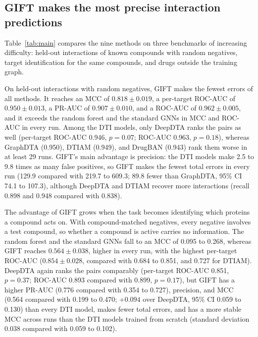 \documentclass[10pt,letterpaper]{article}
\begin{document}
\subsection{GIFT makes the most precise interaction predictions}
\label{sec:classification}
Table~\ref{tab:main} compares the nine methods on three benchmarks of increasing difficulty: held-out interactions of known compounds with random negatives, target identification for the same compounds, and drugs outside the training graph.

On held-out interactions with random negatives, GIFT makes the fewest errors of all methods. It reaches an MCC of $0.818\pm0.019$, a per-target ROC-AUC of $0.950\pm0.013$, a PR-AUC of $0.907\pm0.010$, and a ROC-AUC of $0.962\pm0.005$, and it exceeds the random forest and the standard GNNs in MCC and ROC-AUC in every run. Among the DTI models, only DeepDTA ranks the pairs as well (per-target ROC-AUC 0.946, $p=0.07$; ROC-AUC 0.963, $p=0.18$), whereas GraphDTA (0.950), DTIAM (0.949), and DrugBAN (0.943) rank them worse in at least 29 runs. GIFT's main advantage is precision: the DTI models make 2.5 to 9.8 times as many false positives, so GIFT makes the fewest total errors in every run (129.9 compared with 219.7 to 609.3; 89.8 fewer than GraphDTA, 95\% CI 74.1 to 107.3), although DeepDTA and DTIAM recover more interactions (recall 0.898 and 0.948 compared with 0.838).

The advantage of GIFT grows when the task becomes identifying which proteins a compound acts on. With compound-matched negatives, every negative involves a test compound, so whether a compound is active carries no information. The random forest and the standard GNNs fall to an MCC of 0.095 to 0.268, whereas GIFT reaches $0.564\pm0.038$, higher in every run, with the highest per-target ROC-AUC ($0.854\pm0.028$, compared with 0.684 to 0.851, and 0.727 for DTIAM). DeepDTA again ranks the pairs comparably (per-target ROC-AUC 0.851, $p=0.37$; ROC-AUC 0.893 compared with 0.899, $p=0.17$), but GIFT has a higher PR-AUC (0.776 compared with 0.354 to 0.727), precision, and MCC (0.564 compared with 0.199 to 0.470; $+0.094$ over DeepDTA, 95\% CI 0.059 to 0.130) than every DTI model, makes fewer total errors, and has a more stable MCC across runs than the DTI models trained from scratch (standard deviation 0.038 compared with 0.059 to 0.102).
\end{document}
